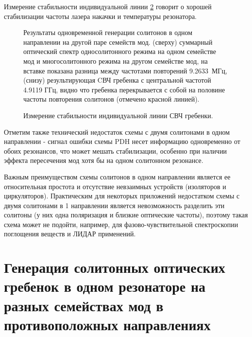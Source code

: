 Измерение стабильности индивидуальной линии \ref{single_line_stability_cp} говорит о хорошей стабилизации частоты лазера накачки и температуры резонатора.

\begin{figure}[!htb]
\begin{minipage}{1\linewidth}
\end{minipage}
\caption{Результаты одновременной генерации солитонов в одном направлении на другой паре семейств мод. (сверху) суммарный оптический спектр односолитонного режима на одном семействе мод и многосолитонного режима на другом семействе мод, на вставке показана разница между частотами повторений 9.2633~МГц, (снизу) результирующая CВЧ гребенка с центральной частотой 4.9119 ГГц, видно что гребенка перекрывается с собой на половине частоты повторения солитонов (отмечено красной линией).}
\label{coscheme_different_types}
\end{figure}

\begin{figure}[!htb]
\begin{minipage}{1\linewidth}
\end{minipage}
\caption{Измерение стабильности индивидуальной линии СВЧ гребенки.}
\label{single_line_stability_cp}
\end{figure}

Отметим также технический недостаток схемы с двумя солитонами в одном направлении - сигнал ошибки схемы PDH несет информацию одновременно от обоих резонансов, что может мешать стабилизации, особенно при наличии эффекта пересечения мод хотя бы на одном солитонном резонансе.

Важным преимуществом схемы солитонов в одном направлении является ее относительная простота и отсутствие невзаимных устройств (изоляторов и циркуляторов). Практическим для некоторых приложений недостатком схемы с двумя солитонами в 1 направлении является невозможность разделить эти солитоны (у них одна поляризация и близкие оптические частоты), поэтому такая схема может не подойти, например, для фазово-чувствительной спектроскопии поглощения веществ и ЛИДАР применений.

\section{Генерация солитонных оптических гребенок в одном резонаторе на разных семействах мод в противоположных направлениях}


